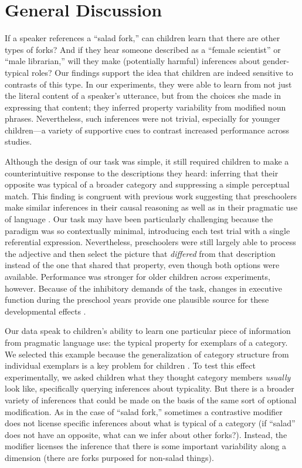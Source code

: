 \documentclass[man]{apa2}
\begin{document}
\section{General Discussion}

If a speaker references a ``salad fork,'' can children learn that there are other types of forks? And if they hear someone described as a ``female scientist'' or ``male librarian,'' will they make (potentially harmful) inferences about gender-typical roles? Our findings support the idea that children are indeed sensitive to contrasts of this type. In our experiments, they were able to learn from not just the literal content of a speaker's utterance, but from the choices she made in expressing that content; they inferred property variability from modified noun phrases. Nevertheless, such inferences were not trivial, especially for younger children---a variety of supportive cues to contrast increased performance across studies.

Although the design of our task was simple, it still required children to make a counterintuitive response to the descriptions they heard: inferring that their opposite was typical of a broader category and suppressing a simple perceptual match. This finding is congruent with previous work suggesting that preschoolers make similar inferences in their causal reasoning \cite{harris1996} as well as in their pragmatic use of language \cite{barner2011,stiller2014}. Our task may have been particularly challenging because the paradigm was so contextually minimal, introducing each test trial with a single referential expression. Nevertheless, preschoolers were still largely able to process the adjective and then select the picture that \emph{differed} from that description instead of the one that shared that property, even though both options were available. Performance was stronger for older children across experiments, however. Because of the inhibitory demands of the task, changes in executive function during the preschool years provide one plausible source for these developmental effects \cite{davidson2006,zelazo2003}. 

Our data speak to children's ability to learn one particular piece of information from pragmatic language use: the typical property for exemplars of a category. We selected this example because the generalization of category structure from individual exemplars is a key problem for children \cite{markman1991}. To test this effect experimentally, we asked children what they thought category members \emph{usually} look like, specifically querying inferences about typicality. But there is a broader variety of inferences that could be made on the basis of the same sort of optional modification. As in the case of ``salad fork,'' sometimes a contrastive modifier does not license specific inferences about what is typical of a category (if ``salad'' does not have an opposite, what can we infer about other forks?). Instead, the modifier licenses the inference that there is some important variability along a dimension (there are forks purposed for non-salad things). 
\end{document}
